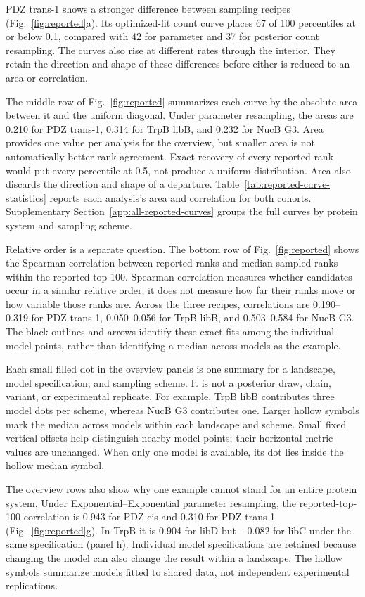 \documentclass[11pt]{article}
\begin{document}
PDZ trans-1 shows a stronger difference between sampling recipes
(Fig.~\ref{fig:reported}a). Its optimized-fit count curve places 67 of
100 percentiles at or below 0.1, compared with 42 for parameter and
37 for posterior count resampling. The curves also rise at different
rates through the interior. They retain the direction and shape of
these differences before either is reduced to an area or correlation.

The middle row of Fig.~\ref{fig:reported} summarizes each curve by the
absolute area between it and the uniform diagonal. Under parameter
resampling, the areas are 0.210 for PDZ trans-1, 0.314 for TrpB libB, and
0.232 for NucB G3. Area provides one value per analysis for the overview,
but smaller area is not automatically better rank agreement. Exact
recovery of every reported rank would put every percentile at 0.5,
not produce a uniform distribution. Area also discards the direction
and shape of a departure. Table~\ref{tab:reported-curve-statistics}
reports each analysis's area and correlation for both cohorts.
Supplementary Section~\ref{app:all-reported-curves} groups the full
curves by protein system and sampling scheme.

Relative order is a separate question. The bottom row of
Fig.~\ref{fig:reported} shows the Spearman correlation between reported
ranks and median sampled ranks within the reported top 100. Spearman
correlation measures whether candidates occur in a similar relative
order; it does not measure how far their ranks move or how variable
those ranks are. Across the three recipes, correlations are
0.190--0.319 for PDZ trans-1, 0.050--0.056 for TrpB libB, and 0.503--0.584
for NucB G3. The black outlines and arrows identify these exact fits
among the individual model points, rather than identifying a
median across models as the example.

Each small filled dot in the overview panels is one summary for a
landscape, model specification, and sampling scheme. It is not a posterior
draw, chain, variant, or experimental replicate. For example, TrpB libB
contributes three model dots per scheme, whereas NucB G3 contributes one.
Larger hollow symbols mark the median across models within each landscape
and scheme. Small fixed vertical offsets help distinguish nearby model
points; their horizontal metric values are unchanged. When only one model
is available, its dot lies inside the hollow median symbol.

The overview rows also show why one example cannot stand for an entire
protein system. Under Exponential--Exponential parameter resampling,
the reported-top-100 correlation is 0.943 for PDZ cis and 0.310 for
PDZ trans-1 (Fig.~\ref{fig:reported}g). In TrpB it is 0.904 for
libD but $-0.082$ for libC under the same specification (panel h).
Individual model specifications are retained because changing the model
can also change the result within a landscape. The hollow symbols summarize
models fitted to shared data, not independent experimental replications.
\end{document}
